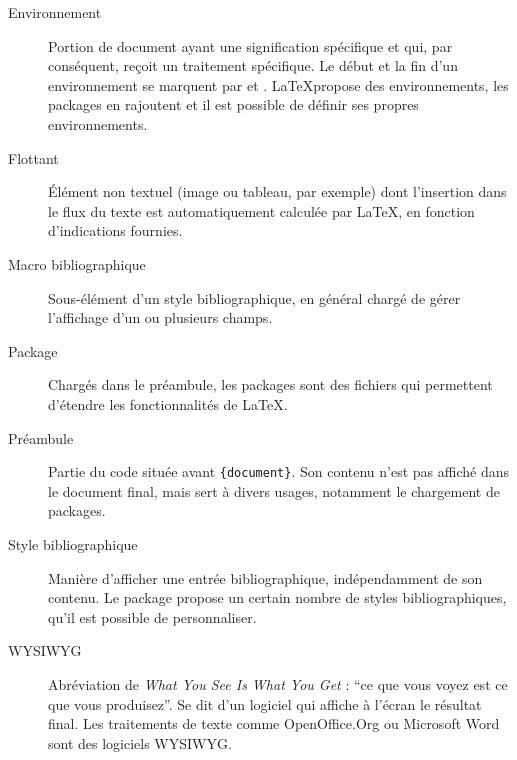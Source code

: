 \begin{description}
\item[Environnement] Portion de document ayant une signification spécifique et qui, par conséquent, reçoit un traitement spécifique. Le début et la fin d'un environnement se marquent par  et . \LaTeX propose des environnements, les packages en rajoutent et il est possible de définir ses propres environnements.

\item[Flottant] Élément non textuel (image ou tableau, par exemple) dont l'insertion dans le flux du texte est automatiquement calculée par \LaTeX, en fonction d'indications fournies.

\item[Macro bibliographique] Sous-élément d'un style bibliographique, en général chargé de gérer l'affichage d'un ou plusieurs champs.

\item[Package] Chargés dans le préambule, les packages sont des fichiers qui permettent d'étendre les fonctionnalités  de \LaTeX.

\item[Préambule] Partie du code  située avant \verb|{document}|. Son contenu n'est pas affiché dans le document final, mais sert à divers usages, notamment le chargement de packages.

\item[Style bibliographique] Manière d'afficher une entrée bibliographique, indépendamment de son contenu. Le package  propose un certain nombre de styles bibliographiques, qu'il est possible de personnaliser. 

\item[WYSIWYG] Abréviation de \textenglish{\emph{What You See Is What You Get}} : \enquote{ce que vous voyez est ce que vous produisez}. Se dit d'un logiciel qui affiche à l'écran le résultat final. Les traitements de texte comme OpenOffice.Org ou Microsoft Word sont des logiciels WYSIWYG.
\end{description}

